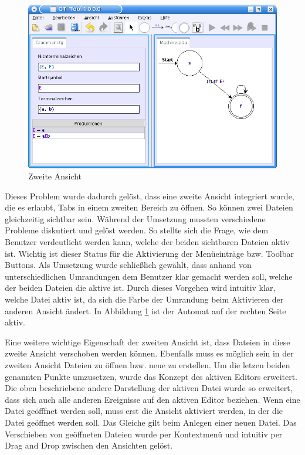 \begin{figure}[h!]
\begin{center}
\includegraphics[width=12cm]{../images/second_view.png}
\caption{Zweite Ansicht}
\label{FigureSecondView}
\end{center}
\end{figure}
\vspace{10pt}

Dieses Problem wurde dadurch gelöst, dass eine zweite Ansicht integriert wurde,
die es erlaubt, Tabs in einem zweiten Bereich zu öffnen. So können zwei Dateien
gleichzeitig sichtbar sein. Während der Umsetzung mussten verschiedene Probleme
diskutiert und gelöst werden. So stellte sich die Frage, wie dem Benutzer
verdeutlicht werden kann, welche der beiden sichtbaren Dateien aktiv ist. Wichtig
ist dieser Status für die Aktivierung der Menüeinträge bzw. Toolbar Buttons. Als
Umsetzung wurde schließlich gewählt, dass anhand von unterschiedlichen
Umrandungen dem Benutzer klar gemacht werden soll, welche der beiden Dateien die
aktive ist. Durch dieses Vorgehen wird intuitiv klar, welche Datei aktiv ist, da
sich die Farbe der Umrandung beim Aktivieren der anderen Ansicht ändert. In
Abbildung \ref{FigureSecondView} ist der Automat auf der rechten Seite
aktiv.\vspace{10pt}

Eine weitere wichtige Eigenschaft der zweiten Ansicht ist, dass Dateien in diese
zweite Ansicht verschoben werden können. Ebenfalls muss es möglich sein in der
zweiten Ansicht Dateien zu öffnen bzw. neue zu erstellen. Um die letzen beiden
genannten Punkte umzusetzen, wurde das Konzept des aktiven Editors erweitert. Die
oben beschriebene andere Darstellung der aktiven Datei wurde so erweitert, dass
sich auch alle anderen Ereignisse auf den aktiven Editor beziehen. Wenn eine
Datei geöfffnet werden soll, muss erst die Ansicht aktiviert werden, in der die
Datei geöffnet werden soll. Das Gleiche gilt beim Anlegen einer neuen Datei. Das
Verschieben von geöffneten Dateien wurde per Kontextmenü und intuitiv per Drag
and Drop zwischen den Ansichten gelöst.\vspace{10pt}


